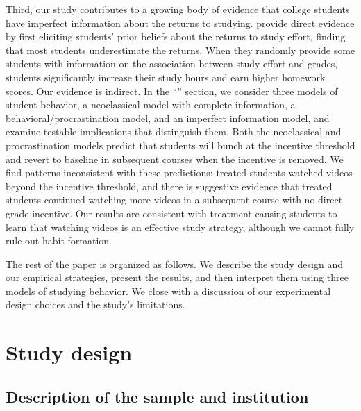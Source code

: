 Third, our study contributes to a growing body of evidence that college students have imperfect information about the returns to studying.
\textcite{rc2023} provide direct evidence by first eliciting students' prior beliefs about the returns to study effort, finding that most students underestimate the returns.
When they randomly provide some students with information on the association between study effort and grades, students significantly increase their study hours and earn higher homework scores.
Our evidence is indirect.
In the ``'' section, we consider three models of student behavior, a neoclassical model with complete information, a behavioral/procrastination model, and an imperfect information model, and examine testable implications that distinguish them.
Both the neoclassical and procrastination models predict that students will bunch at the incentive threshold and revert to baseline in subsequent courses when the incentive is removed.
We find patterns inconsistent with these predictions: treated students watched videos beyond the incentive threshold, and there is suggestive evidence that treated students continued watching more videos in a subsequent course with no direct grade incentive.
Our results are consistent with treatment causing students to learn that watching videos is an effective study strategy, although we cannot fully rule out habit formation.

The rest of the paper is organized as follows.
We describe the study design and our empirical strategies, present the results, and then interpret them using three models of studying behavior.
We close with a discussion of our experimental design choices and the study's limitations.


\section{Study design} \label{sec:studydesign}

\subsection{Description of the sample and institution}\label{subsec:description}

